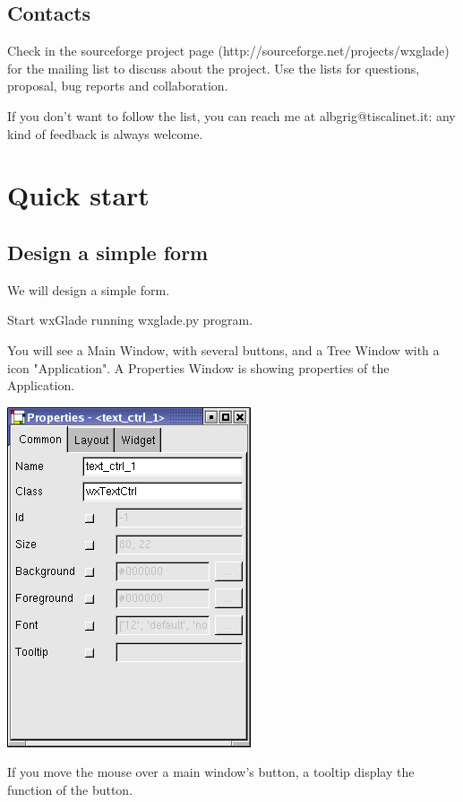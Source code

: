 \documentclass[a4paper,10pt]{report}
\begin{document}
  \section{Contacts}
  Check in the sourceforge project page (http://sourceforge.net/projects/wxglade)
  for the mailing list to discuss about the project.
  Use the lists for questions, proposal, bug reports and collaboration.

  If you don't want to follow the list, you can reach me at albgrig@tiscalinet.it:
  any kind of feedback is always welcome.

  \chapter{Quick start}

  \section{Design a simple form}



  We will design a simple form.

  Start wxGlade running wxglade.py program.

  You will see a Main Window, with several buttons, and a Tree
  Window with a icon "Application".  A Properties Window is showing
  properties of the Application.


  \includegraphics{manual_prop.png}

If you move the mouse over a main window's button, a tooltip
display the function of the button.
\end{document}
